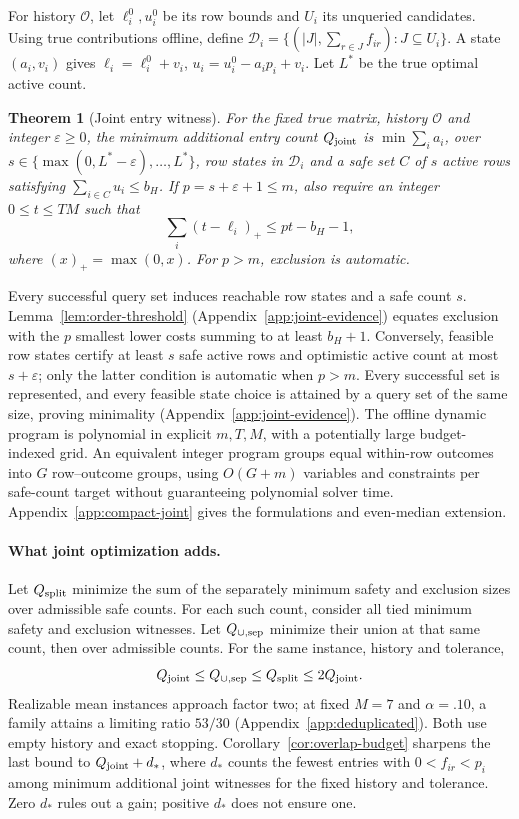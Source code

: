 \documentclass[11pt]{article}
\newtheorem{theorem}{Theorem}
\begin{document}
For history $\mathcal O$, let $\ell_i^0,u_i^0$ be its row bounds and $U_i$ its unqueried candidates. Using true contributions offline, define $\mathcal D_i=\{(|J|,\sum_{r\in J}f_{ir}):J\subseteq U_i\}$. A state $(a_i,v_i)$ gives $\ell_i=\ell_i^0+v_i$, $u_i=u_i^0-a_ip_i+v_i$. Let $L^*$ be the true optimal active count.
\begin{theorem}[Joint entry witness]
\label{thm:joint}
For the fixed true matrix, history $\mathcal O$ and integer $\varepsilon\ge0$, the minimum additional entry count $Q_{\rm joint}$ is $\min\sum_i a_i$, over $s\in\{\max(0,L^*-\varepsilon),\ldots,L^*\}$, row states in $\mathcal D_i$ and a safe set $C$ of $s$ active rows satisfying $\sum_{i\in C}u_i\le b_H$. If $p=s+\varepsilon+1\le m$, also require an integer $0\le t\le TM$ such that
\[
 \sum_i(t-\ell_i)_+\le pt-b_H-1,
\]
where $(x)_+=\max(0,x)$. For $p>m$, exclusion is automatic.
\end{theorem}
Every successful query set induces reachable row states and a safe count $s$. Lemma~\ref{lem:order-threshold} (Appendix~\ref{app:joint-evidence}) equates exclusion with the $p$ smallest lower costs summing to at least $b_H+1$. Conversely, feasible row states certify at least $s$ safe active rows and optimistic active count at most $s+\varepsilon$; only the latter condition is automatic when $p>m$. Every successful set is represented, and every feasible state choice is attained by a query set of the same size, proving minimality (Appendix~\ref{app:joint-evidence}). The offline dynamic program is polynomial in explicit $m,T,M$, with a potentially large budget-indexed grid. An equivalent integer program groups equal within-row outcomes into $G$ row--outcome groups, using $O(G+m)$ variables and constraints per safe-count target without guaranteeing polynomial solver time. Appendix~\ref{app:compact-joint} gives the formulations and even-median extension.

\paragraph{What joint optimization adds.}
Let $Q_{\rm split}$ minimize the sum of the separately minimum safety and exclusion sizes over admissible safe counts. For each such count, consider all tied minimum safety and exclusion witnesses. Let $Q_{\cup,\rm sep}$ minimize their union at that same count, then over admissible counts. For the same instance, history and tolerance,
\[
 Q_{\rm joint}\le Q_{\cup,\rm sep}\le Q_{\rm split}\le2Q_{\rm joint}.
\]
Realizable mean instances approach factor two; at fixed $M=7$ and $\alpha=.10$, a family attains a limiting ratio $53/30$ (Appendix~\ref{app:deduplicated}). Both use empty history and exact stopping. Corollary~\ref{cor:overlap-budget} sharpens the last bound to $Q_{\rm joint}+d_*$, where $d_*$ counts the fewest entries with $0<f_{ir}<p_i$ among minimum additional joint witnesses for the fixed history and tolerance. Zero $d_*$ rules out a gain; positive $d_*$ does not ensure one.
\end{document}
